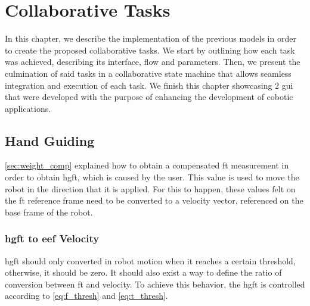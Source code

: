 \chapter{Collaborative Tasks}
\label{chp:5-tasks}

\par In this chapter, we describe the implementation of the previous models in order to create the proposed collaborative tasks. We start by outlining how each task was achieved, describing its interface, flow and parameters. Then, we present the culmination of said tasks in a collaborative state machine that allows seamless integration and execution of each task. We finish this chapter showcasing 2 \ac{gui} that were developed with the purpose of enhancing the development of cobotic applications.





\section{Hand Guiding}

\par \autoref{sec:weight_comp} explained how to obtain a compensated \ac{ft} measurement in order to obtain \acf{hgft}, which is caused by the user. This value is used to move the robot in the direction that it is applied. For this to happen, these values felt on the \ac{ft} reference frame need to be converted to a velocity vector, referenced on the base frame of the robot. 



\subsection{\ac{hgft} to \ac{eef} Velocity}
\label{ssec:ft_to_eef}

\par \ac{hgft} should only converted in robot motion when it reaches a certain threshold, otherwise, it should be zero. It should also exist a way to define the ratio of conversion between \ac{ft} and velocity. To achieve this behavior, the \ac{hgft} is controlled according to \autoref{eq:f_thresh} and \autoref{eq:t_thresh}.

